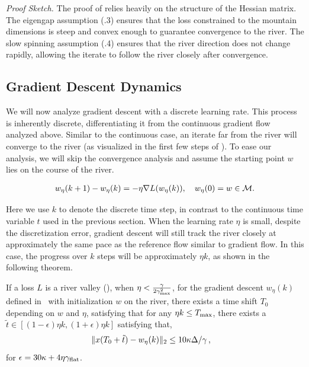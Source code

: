 \emph{Proof Sketch.} The proof of  relies heavily on the structure of the Hessian matrix. The eigengap assumption (.3) ensures that the loss constrained to the mountain dimensions is steep and convex enough to guarantee convergence to the river. The slow spinning assumption (.4) ensures that the river direction does not change rapidly, allowing the iterate to follow the river closely after convergence.




\subsection{Gradient Descent Dynamics}


We will now analyze gradient descent with a discrete learning rate. This process is inherently discrete, differentiating it from the continuous gradient flow analyzed above. Similar to the continuous case, an iterate far from the river will converge to the river (as visualized in the first few steps of ). 
To ease our analysis, we will skip the convergence analysis and assume the starting point $w$ lies on the course of the river. 

\begin{align}
\label{eq:gdflow}
    w_{\eta}(k + 1) - w_{\eta}(k) = - \eta \nabla L(w_{\eta}(k)), \quad w_{\eta}(0) = w \in \mathcal{M}.  
\end{align}

Here we use $k$ to denote the discrete time step, in contrast to the continuous time variable $t$ used in the previous section.
When the learning rate $\eta$ is small, despite the discretization error, gradient descent will still track the river closely at approximately the same pace as the reference flow similar to gradient flow.  In this case, the progress over $k$ steps will be approximately $\eta k$, as shown in the following theorem. 


\begin{theorem}
\label{thm:gdtracksriver}
If a loss $L$ is a river valley (), when $\eta < \frac{\gamma}{2\gamma_{\mathrm{max}}^2}$, for the gradient descent $w_{\eta}(k)$ defined in~ with initialization $w$ on the river, there exists a time shift $T_0$ depending on $w$ and $\eta$, satisfying that for any $\eta k \le T_{\mathrm{max}}$, there exists a $\tilde t \in [(1-\epsilon)\eta k, (1+\epsilon)\eta k]$  satisfying that,
\begin{align*}
\| x(T_0 + \tilde{t}) - w_{\eta}(k) \|_2 &\le  10 \kappa \Delta/\gamma\,,
\end{align*}
for $\epsilon = 30 \kappa + 4\eta \gamma_{\mathrm{flat}}$. 
\end{theorem}




